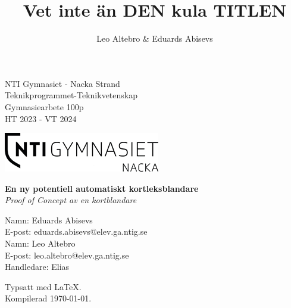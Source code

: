 \documentclass[swedish,a4paper]{article}
\title{Vet inte än DEN kula TITLEN}
\author{Leo Altebro & Eduards Abisevs}
\begin{document}
\begin{titlepage}
	\begin{minipage}[t]{0.45\textwidth}
		\raggedright
		NTI Gymnasiet - Nacka Strand \\
		Teknikprogrammet-Teknikvetenskap \\
		Gymnasiearbete 100p \\
		HT 2023 - VT 2024
	\end{minipage}
	\begin{minipage}[t]{0.5\textwidth}
		\raggedleft
		\begin{adjustbox}{valign=t}
			\includegraphics[width=\linewidth]{images/logo.png}
		\end{adjustbox}
	\end{minipage}

	\vspace*{\fill} %

	\begin{center}
		\Large\textbf{En ny potentiell automatiskt kortleksblandare}\\
		\large\textit{Proof of Concept av en kortblandare}
	\end{center}

	\vspace*{\fill} %

	\begin{minipage}[b]{0.45\textwidth}
		\raggedright
		Namn: Eduards Abisevs\\
		E-post: eduards.abisevs@elev.ga.ntig.se\\
		Namn: Leo Altebro\\
		E-post: leo.altebro@elev.ga.ntig.se\\
		Handledare: Elias
	\end{minipage}
	\begin{minipage}[b]{0.5\textwidth}
		\raggedleft
		Typsatt med \LaTeX. \\
		Kompilerad \today.
	\end{minipage}
\end{titlepage}

\end{document}
